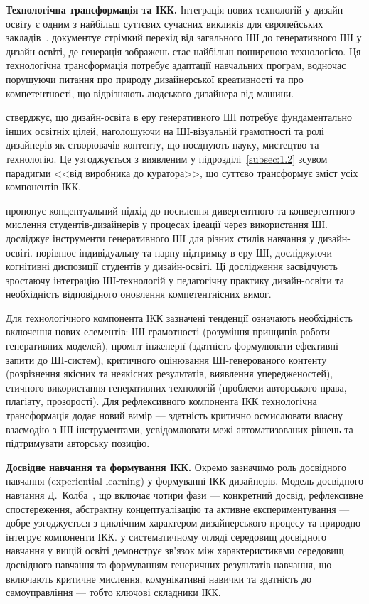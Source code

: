 \textbf{Технологічна трансформація та ІКК.} Інтеграція нових технологій у дизайн-освіту є одним з найбільш суттєвих сучасних викликів для європейських закладів~\cite{Chen2025}. \citet{Song2025401} документує стрімкий перехід від загального ШІ до генеративного ШІ у дизайн-освіті, де генерація зображень стає найбільш поширеною технологією. Ця технологічна трансформація потребує адаптації навчальних програм, водночас порушуючи питання про природу дизайнерської креативності та про компетентності, що відрізняють людського дизайнера від машини.

\citet{Hwang2025239} стверджує, що дизайн-освіта в еру генеративного ШІ потребує фундаментально інших освітніх цілей, наголошуючи на ШІ-візуальній грамотності та ролі дизайнерів як створювачів контенту, що поєднують науку, мистецтво та технологію. Це узгоджується з виявленим у підрозділі~\ref{subsec:1.2} зсувом парадигми <<від виробника до куратора>>, що суттєво трансформує зміст усіх компонентів ІКК.

\citet{Melker20251871} пропонує концептуальний підхід до посилення дивергентного та конвергентного мислення студентів-дизайнерів у процесах ідеації через використання ШІ. \citet{Chandrasekera2025358} досліджує інструменти генеративного ШІ для різних стилів навчання у дизайн-освіті. \citet{Yusuf2026} порівнює індивідуальну та парну підтримку в еру ШІ, досліджуючи когнітивні диспозиції студентів у дизайн-освіті. Ці дослідження засвідчують зростаючу інтеграцію ШІ-технологій у педагогічну практику дизайн-освіти та необхідність відповідного оновлення компетентнісних вимог.

Для технологічного компонента ІКК зазначені тенденції означають необхідність включення нових елементів: ШІ-грамотності (розуміння принципів роботи генеративних моделей), промпт-інженерії (здатність формулювати ефективні запити до ШІ-систем), критичного оцінювання ШІ-генерованого контенту (розрізнення якісних та неякісних результатів, виявлення упередженостей), етичного використання генеративних технологій (проблеми авторського права, плагіату, прозорості). Для рефлексивного компонента ІКК технологічна трансформація додає новий вимір --- здатність критично осмислювати власну взаємодію з ШІ-інструментами, усвідомлювати межі автоматизованих рішень та підтримувати авторську позицію.

\textbf{Досвідне навчання та формування ІКК.} Окремо зазначимо роль досвідного навчання (experiential learning) у формуванні ІКК дизайнерів. Модель досвідного навчання Д.~Колба~\cite{Kolb1984}, що включає чотири фази --- конкретний досвід, рефлексивне спостереження, абстрактну концептуалізацію та активне експериментування --- добре узгоджується з циклічним характером дизайнерського процесу та природно інтегрує компоненти ІКК. \citet{Duchatelet2024400} у систематичному огляді середовищ досвідного навчання у вищій освіті демонструє зв'язок між характеристиками середовищ досвідного навчання та формуванням генеричних результатів навчання, що включають критичне мислення, комунікативні навички та здатність до самоуправління --- тобто ключові складники ІКК.

